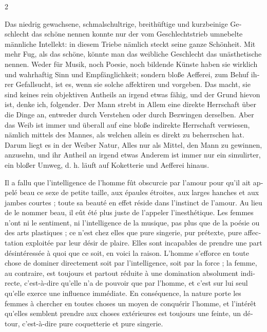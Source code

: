 \documentclass[a4paper,12pt]{article}
\newcommand\chunks[2]{%
\begin{leftcolumn*}\begin{otherlanguage}{german}%
{#1}%
\end{otherlanguage}\end{leftcolumn*}%
\begin{rightcolumn}\begin{otherlanguage}{french}%
{#2}%
\end{otherlanguage}\end{rightcolumn}%
}
\begin{document}
\begin{paracol}{2}
  \chunks{Das niedrig gewachsene, schmalschultrige, breithüftige und kurzbeinige Geschlecht das schöne nennen konnte nur der vom Geschlechtstrieb umnebelte männliche Intellekt: in diesem Triebe nämlich steckt seine ganze Schönheit. Mit mehr Fug, als das schöne, könnte man das weibliche Geschlecht das unästhetische nennen. Weder für Musik, noch Poesie, noch bildende Künste haben sie wirklich und wahrhaftig Sinn und Empfänglichkeit; sondern bloße Aefferei, zum Behuf ihrer Gefallsucht, ist es, wenn sie solche affektiren und vorgeben. Das macht, sie sind keines rein objektiven Antheils an irgend etwas fähig, und der Grund hievon ist, denke ich, folgender. Der Mann strebt in Allem eine direkte Herrschaft über die Dinge an, entweder durch Verstehen oder durch Bezwingen derselben. Aber das Weib ist immer und überall auf eine bloße indirekte Herrschaft verwiesen, nämlich mittels des Mannes, als welchen allein es direkt zu beherrschen hat. Darum liegt es in der Weiber Natur, Alles nur als Mittel, den Mann zu gewinnen, anzusehn, und ihr Antheil an irgend etwas Anderem ist immer nur ein simulirter, ein bloßer Umweg, d. h. läuft auf Koketterie und Aefferei hinaus.}
         {Il a fallu que l’intelligence de l’homme fût obscurcie par l’amour pour qu’il ait appelé beau ce sexe de petite taille, aux épaules étroites, aux larges hanches et aux jambes courtes ; toute sa beauté en effet réside dans l’instinct de l’amour. Au lieu de le nommer beau, il eût été plus juste de l’appeler l’inesthétique. Les femmes n’ont ni le sentiment, ni l’intelligence de la musique, pas plus que de la poésie ou des arts plastiques ; ce n’est chez elles que pure singerie, pur prétexte, pure affectation exploitée par leur désir de plaire. Elles sont incapables de prendre une part désintéressée à quoi que ce soit, en voici la raison. L’homme s’efforce en toute chose de dominer directement soit par l’intelligence, soit par la force ; la femme, au contraire, est toujours et partout réduite à une domination absolument indirecte, c’est-à-dire qu’elle n’a de pouvoir que par l’homme, et c’est sur lui seul qu’elle exerce une influence immédiate. En conséquence, la nature porte les femmes à chercher en toutes choses un moyen de conquérir l’homme, et l’intérêt qu’elles semblent prendre aux choses extérieures est toujours une feinte, un détour, c’est-à-dire pure coquetterie et pure singerie.}

\end{paracol}
\end{document}

